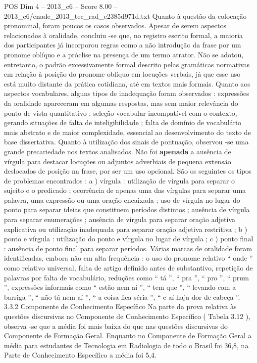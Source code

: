 \begin{textsample}{POS Dim 4 – 2013\_c6 – Score 8.00 – 2013\_c6/enade\_2013\_tec\_rad\_c2385d971d.txt}
Quanto à questão da colocação pronominal, foram poucos os casos observados.
Apesar de serem aspectos relacionados à oralidade, concluiu -se que, no registro escrito formal, a maioria dos participantes já incorporou regras como a não introdução da frase por um pronome oblíquo e a próclise na presença de um termo atrator.
Não se adotou, entretanto, o padrão excessivamente formal descrito pelas gramáticas normativas em relação à posição do pronome oblíquo em locuções verbais, já que esse uso está muito distante da prática cotidiana, até em textos mais formais.
Quanto aos aspectos vocabulares, alguns tipos de inadequação foram observados : expressões da oralidade apareceram em algumas respostas, mas sem maior relevância do ponto de vista quantitativo ; seleção vocabular incompatível com o contexto, gerando situações de falta de inteligibilidade ; falta de domínio de vocabulário mais abstrato e de maior complexidade, essencial ao desenvolvimento do texto de base dissertativa.
Quanto à utilização dos sinais de pontuação, observou -se uma grande precariedade nos textos analisados.
Não foi \textbf{apenada} a ausência de vírgula para destacar locuções ou adjuntos adverbiais de pequena extensão deslocados de posição na frase, por ser um uso opcional.
São os seguintes os tipos de problemas encontrados : a ) vírgula : utilização de vírgula para separar o sujeito e o predicado ; ocorrência de apenas uma das vírgulas para separar uma palavra, uma expressão ou uma oração encaixada ; uso de vírgula no lugar do ponto para separar ideias que constituem períodos distintos ; ausência de vírgula para separar enumerações ; ausência de vírgula para separar oração adjetiva explicativa ou utilização inadequada para separar oração adjetiva restritiva ; b ) ponto e vírgula : utilização do ponto e vírgula no lugar de vírgula ; c ) ponto final : ausência de ponto final para separar períodos.
Várias marcas de oralidade foram identificadas, embora não em alta frequência : o uso do pronome relativo “ onde ” como relativo universal, falta de artigo definido antes de substantivo, repetição de palavras por falta de vocabulário, reduções como “ tá ”, “ pra ”, “ pro ”, “ prum ”, expressões informais como “ estão nem aí ”, “ tem que ”, “ levando com a barriga ”, “ não tá nem aí ”, “ a coisa fica séria ”, “ e aí haja dor de cabeça ”. 3.3.2 Componente de Conhecimento Específico Na parte da prova relativa às questões discursivas no Componente de Conhecimento Específico ( Tabela 3.12 ), observa -se que a média foi mais baixa do que nas questões discursivas do Componente de Formação Geral.
Enquanto no Componente de Formação Geral a média para estudantes de Tecnologia em Radiologia de todo o Brasil foi 36,8, na Parte de Conhecimento Específico a média foi 5,4.

\end{textsample}
